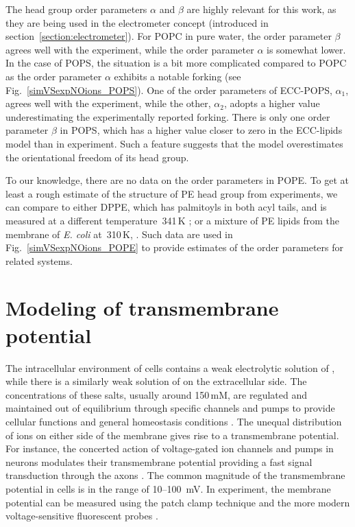 The head group order parameters $\alpha$ and $\beta$ are highly relevant for this work,
as they are being used in the electrometer concept (introduced in section~\ref{section:electrometer}). 
For POPC in pure water, the order parameter $\beta$ agrees well with the experiment, 
while the order parameter $\alpha$ is somewhat lower. 
In the case of POPS, the situation is a bit more complicated
compared to POPC as the order parameter $\alpha$ exhibits a notable forking (see Fig.~\ref{simVSexpNOions_POPS}).
One of the order parameters of ECC-POPS, $\alpha_1$, agrees well with the experiment, 
while the other, $\alpha_2$, adopts a higher value underestimating the experimentally reported forking. 
There is only one order parameter $\beta$ in POPS, 
which has a higher value closer to zero in the ECC-lipids model than in experiment. 
Such a feature suggests that the model overestimates the orientational freedom of its head group. 

To our knowledge, there are no data on the order parameters in POPE. 
To get at least a rough estimate of the structure of PE head group from experiments, 
we can compare to either DPPE, which has palmitoyls in both acyl tails, and is measured at a different temperature~341\,K \citep{seelig76, seelig80};
or a mixture of PE lipids from the membrane of \emph{E. coli} at~310\,K, \citep{gally81}. 
Such data are used in Fig.~\ref{simVSexpNOions_POPE} to provide estimates of the order parameters for related systems. 
 
 
 






\section{Modeling of transmembrane potential}

The intracellular environment of cells contains a weak electrolytic solution of , 
while there is a similarly weak solution of  on the extracellular side. 
The concentrations of these salts, usually around 150\,mM, 
are regulated and maintained out of equilibrium through specific channels and pumps 
to provide cellular functions and general homeostasis conditions \citep{Bezanilla2008, Knudsen_book2002}. 
The unequal distribution of ions on either side of the membrane
gives rise to a transmembrane potential. 
For instance, the concerted action of voltage-gated ion channels and pumps in neurons 
modulates their transmembrane potential
providing a fast signal transduction through the axons \citep{Knudsen_book2002, Storace2015, Sung2015}. 
The common magnitude of the transmembrane potential in cells is in the range of 10--100~mV. 
In experiment, the membrane potential can be measured using the patch clamp technique \citep{Bezanilla2008}
and the more modern voltage-sensitive fluorescent probes \citep{Storace2015, Sung2015}. 

